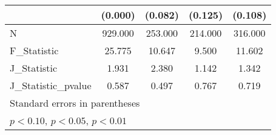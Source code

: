 {\begin{tabular}{l*{4}{c}}
            &     (0.000)         &     (0.082)         &     (0.125)         &     (0.108)         \\
\hline
N           &     929.000         &     253.000         &     214.000         &     316.000         \\
F\_Statistic &      25.775         &      10.647         &       9.500         &      11.602         \\
J\_Statistic &       1.931         &       2.380         &       1.142         &       1.342         \\
J\_Statistic\_pvalue&       0.587         &       0.497         &       0.767         &       0.719         \\
\hline\hline
\multicolumn{5}{l}{\footnotesize Standard errors in parentheses}\\
\multicolumn{5}{l}{\footnotesize \sym{*} \(p<0.10\), \sym{**} \(p<0.05\), \sym{***} \(p<0.01\)}\\
\end{tabular}
}

